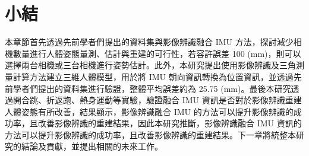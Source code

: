 \clearpage


\section{小結}
本章節首先透過先前學者們提出的資料集與影像辨識融合 IMU 方法，探討減少相機數量進行人體姿態量測、估計與重建的可行性，若容許誤差 100 (mm)，則可以選擇兩台相機或三台相機進行姿勢估計。此外，本研究提出使用影像辨識及三角測量計算方法建立三維人體模型，用於將 IMU 朝向資訊轉換為位置資訊，並透過先前學者們提出的資料集進行驗證，整體平均誤差約為 25.75 (mm)。最後本研究透過開合跳、折返跑、熱身運動等實驗，驗證融合 IMU 資訊是否對於影像辨識重建人體姿態有所改善，結果顯示，影像辨識融合 IMU 的方法可以提升影像辨識的成功率，且改善影像辨識的重建結果，因此本研究推斷，影像辨識融合 IMU 資訊的方法可以提升影像辨識的成功率，且改善影像辨識的重建結果。下一章將統整本研究的結論及貢獻，並提出相關的未來工作。

\clearpage